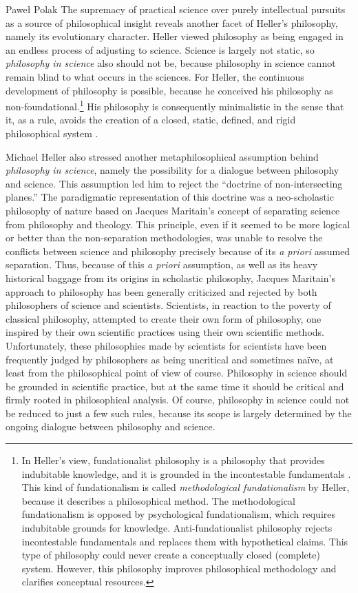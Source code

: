 \begin{artengenv}{Paweł Polak}
The supremacy of practical science over purely intellectual pursuits as a source of philosophical insight reveals
another facet of Heller’s philosophy, namely its evolutionary character. Heller viewed philosophy as being engaged in
an endless process of adjusting to science. Science is largely not static, so \textit{philosophy in science }also
should not be, because philosophy in science cannot remain blind to what occurs in the sciences. For Heller, the
continuous development of philosophy is possible, because he conceived his philosophy as non-foundational.\footnote{In
Heller’s view, fundationalist philosophy is a philosophy that provides indubitable knowledge, and it is grounded in the
incontestable fundamentals
\parencite{pol_heller_nauki_2006}.
This kind of fundationalism is called \textit{methodological fundationalism
}by Heller, because it describes a philosophical method. The methodological fundationalism is opposed by psychological
fundationalism, which requires indubitable grounds for knowledge. Anti-fundationalist philosophy rejects incontestable
fundamentals and replaces them with hypothetical claims. This type of philosophy could never create a conceptually
closed (complete) system. However, this philosophy improves philosophical methodology and clarifies conceptual
resources.} His philosophy is consequently minimalistic in the sense that it, as a rule, avoids the creation of a
closed, static, defined, and rigid philosophical system
\parencite[p.34]{pol_heller_przeciw_2006}.

Michael Heller also stressed another metaphilosophical assumption behind \textit{philosophy in science}, namely the
possibility for a dialogue between philosophy and science. This assumption led him to reject the ``doctrine of
non-intersecting planes.'' The paradigmatic representation of this doctrine was a neo-scholastic philosophy of nature
based on Jacques Maritain’s concept of separating science from philosophy and theology. This principle, even if it
seemed to be more logical or better than the non-separation methodologies, was unable to resolve the conflicts between
science and philosophy precisely because of its \textit{a priori} assumed separation. Thus, because of this\textit{ a
priori} assumption, as well as its heavy historical baggage from its origins in scholastic philosophy, Jacques
Maritain’s approach to philosophy has been generally criticized and rejected by both philosophers of science and
scientists. Scientists, in reaction to the poverty of classical philosophy, attempted to create their own form of
philosophy, one inspired by their own scientific practices using their own scientific methods. Unfortunately, these
philosophies made by scientists for scientists have been frequently judged by philosophers as being uncritical and
sometimes naïve, at least from the philosophical point of view of course. Philosophy in science should be grounded in
scientific practice, but at the same time it should be critical and firmly rooted in philosophical analysis. Of course,
philosophy in science could not be reduced to just a few such rules, because its scope is largely determined by the
ongoing dialogue between philosophy and science. 


\end{artengenv}
